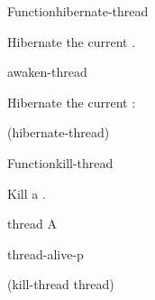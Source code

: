 \documentclass[10pt,twoside,english,pdftex]{article}
\begin{document}

\begin{functiondoc}{Function}{hibernate-thread}{\noargs{}}
%

\fnsyntax

\fnpurpose Hibernate the current .

\fnpackage {}

\fnmodule {}

\fnerrors
\nothreads{}

\begin{alsos}{awaken-thread}
\end{alsos}

\fnexample
Hibernate the current :
\begin{example}
  (hibernate-thread)
\end{example}

\end{functiondoc}


\begin{functiondoc}{Function}{kill-thread}{}
%
%

\fnsyntax

\fnpurpose Kill a .

\fnpackage {}

\fnmodule {}

\fnargs
\begin{args}{thread}
\arg[thread] A 
\end{args}

\fnerrors
\nothreads{}

\begin{alsos}{thread-alive-p}
\end{alsos}

\fnexample
\begin{example}
  (kill-thread thread)
\end{example}

\end{functiondoc}

\end{document}
